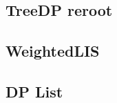     \subsection{TreeDP reroot}
        
    \subsection{WeightedLIS}
        
    \columnbreak
    \subsection{DP List}
        
    

%         
